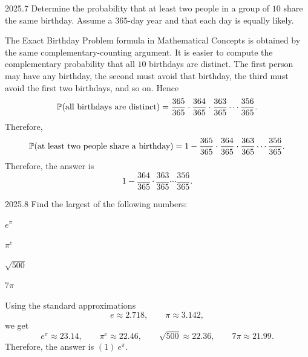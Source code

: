    \begin{pastproblem}{2025.7}
        Determine the probability that at least two people in a group of $10$ share the same
        birthday. Assume a $365$-day year and that each day is equally likely.
    \end{pastproblem}

    \begin{solution}
        The Exact Birthday Problem formula in Mathematical Concepts is obtained by
        the same complementary-counting argument. It is easier to compute the complementary probability that all $10$ birthdays are distinct.
        The first person may have any birthday, the second must avoid that birthday, the third must
        avoid the first two birthdays, and so on. Hence
        \[
            \mathbb{P}(\text{all birthdays are distinct})
            =
            \frac{365}{365}\cdot\frac{364}{365}\cdot\frac{363}{365}\cdots\frac{356}{365}.
        \]
        Therefore,
        \[
            \mathbb{P}(\text{at least two people share a birthday})
            =
            1-\frac{365}{365}\cdot\frac{364}{365}\cdot\frac{363}{365}\cdots\frac{356}{365}.
        \]
        Therefore, the answer is
        \[
            \boxed{1-\frac{364}{365}\cdot\frac{363}{365}\cdots\frac{356}{365}}.
        \]
    \end{solution}

    \begin{pastproblem}{2025.8}
        Find the largest of the following numbers:
        \begin{problemchoices}
            \item \(e^\pi\)
            \item \(\pi^e\)
            \item \(\sqrt{500}\)
            \item $7\pi$
        \end{problemchoices}
    \end{pastproblem}

    \begin{solution}
        Using the standard approximations
        \[
            e\approx 2.718,
            \qquad
            \pi\approx 3.142,
        \]
        we get
        \[
            e^\pi \approx 23.14,
            \qquad
            \pi^e \approx 22.46,
            \qquad
            \sqrt{500} \approx 22.36,
            \qquad
            7\pi \approx 21.99.
        \]
        Therefore, the answer is $\boxed{(1)\ e^\pi}$.
    \end{solution}

